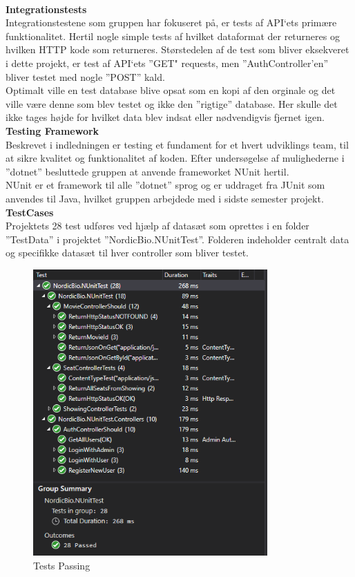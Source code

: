 \\
\textbf{Integrationstests}\\
Integrationstestene som gruppen har fokuseret på, er tests af API‘ets primære funktionalitet. 
Hertil nogle simple tests af hvilket dataformat der returneres og hvilken HTTP kode som returneres. 
Størstedelen af de test som bliver eksekveret i dette projekt, er test af API‘ets ”GET" requests, men 
”AuthController’en” bliver testet med nogle ”POST” kald. \\

Optimalt ville en test database blive opsat som en kopi af den orginale og det ville være denne som 
blev testet og ikke den ”rigtige” database. Her skulle det ikke tages højde for hvilket data blev indsat 
eller nødvendigvis fjernet igen.\\ 

\textbf{Testing Framework}\\
Beskrevet i indledningen er testing et fundament for et hvert udviklings team, til at sikre 
kvalitet og funktionalitet af koden. Efter undersøgelse af mulighederne i ”dotnet” besluttede 
gruppen at anvende frameworket NUnit hertil. \\

NUnit\cite{NUnit} er et framework til alle ”dotnet” sprog og er uddraget fra JUnit som anvendes til Java, 
hvilket gruppen arbejdede med i sidste semester projekt.\\

\textbf{TestCases}\\
Projektets 28 test udføres ved hjælp af datasæt som oprettes i en folder ”TestData” i projektet 
”NordicBio.NUnitTest”. Folderen indeholder centralt data og specifikke datasæt til hver controller 
som bliver testet. \\

\begin{figure}[!h]
    \centering
    \includegraphics[width=0.8\textwidth]{figures/testpassing.PNG}
    \caption{Tests Passing}
    \label{fig:testpassing}
\end{figure}

